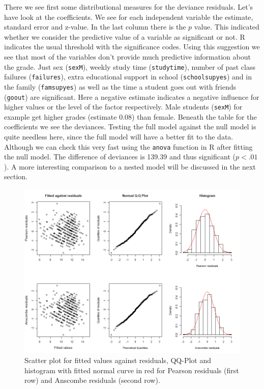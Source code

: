 There we see first some distributional measures for the deviance residuals. Let's have look at the coefficients. We see for each independent variable the estimate, standard error and z-value. In the last column there is the $p$ value. This indicated whether we consider the predictive value of a variable as significant or not. R indicates the usual threshold with the significance codes. Using this suggestion we see that most of the variables don't provide much predictive information about the grade. Just sex (\texttt{sexM}), weekly study time (\texttt{studytime}), number of past class failures (\texttt{failures}), extra educational support in school (\texttt{schoolsupyes}) and in the family (\texttt{famsupyes}) as well as the time a student goes out with friends (\texttt{goout}) are significant. Here a negative estimate indicates a negative influence for higher values or the level of the factor respectively. Male students (\texttt{sexM}) for example get higher grades (estimate 0.08) than female. Beneath the table for the coefficients we see the deviances. Testing the full model against the null model is quite needless here, since the full model will have a better fit to the data. Although we can check this very fast using the \texttt{anova} function in R after fitting the null model. The difference of deviances is 139.39 and thus significant ($p<.01$). A more interesting comparison to a nested model will be discussed in the next section. 

\begin{figure}[!h]
\centering
\includegraphics[width=\textwidth, keepaspectratio]{ex7/residuals.png}
\caption{Scatter plot for fitted values against residuals, QQ-Plot and histogram with fitted normal curve in red for Pearson residuals (first row) and Anscombe residuals (second row).}
\label{4resid}
\end{figure}

